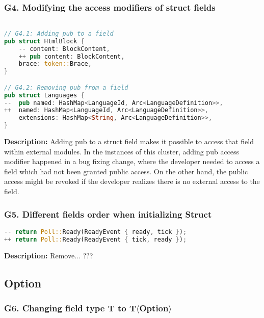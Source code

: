 \subsubsection{G4. Modifying the access modifiers of struct fields}

\begin{lstlisting}[language=Rust, style=colouredRust, label={l3}]

// G4.1: Adding pub to a field
pub struct HtmlBlock {
    -- content: BlockContent,
    ++ pub content: BlockContent,
    brace: token::Brace,
} 

// G4.2: Removing pub from a field
pub struct Languages {
--  pub named: HashMap<LanguageId, Arc<LanguageDefinition>>,
++  named: HashMap<LanguageId, Arc<LanguageDefinition>>,
    extensions: HashMap<String, Arc<LanguageDefinition>>,
}

\end{lstlisting}

\noindent \textbf{Description:} Adding pub to a struct field makes it possible to access that field within external modules. In the instances of this cluster, adding pub access modifier happened in a bug fixing change, where the developer needed to access a field which had not been granted public access. On the other hand, the public access might be revoked if the developer realizes there is no external access to the field.

\subsubsection{G5. Different fields order when initializing Struct}

\begin{lstlisting}[language=Rust, style=colouredRust, label={l3}]
-- return Poll::Ready(ReadyEvent { ready, tick });
++ return Poll::Ready(ReadyEvent { tick, ready });

\end{lstlisting}

\noindent \textbf{Description:} Remove... ???

\subsection{Option}
\subsubsection{G6. Changing field type T to T$\langle$Option$\rangle$}

